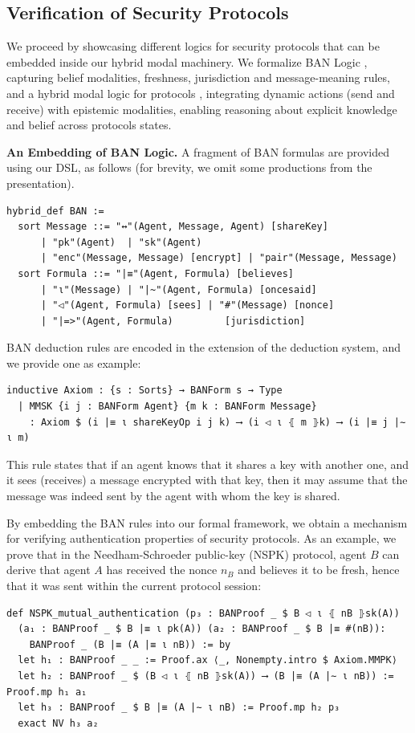 \documentclass{easychair}
\theoremstyle{remark}
\begin{document}
\subsection{Verification of Security Protocols}

We proceed by showcasing different logics for security protocols that can be embedded inside our hybrid modal machinery. We formalize BAN Logic \cite{ban}, capturing belief modalities, freshness, jurisdiction and message-meaning rules, and a hybrid modal logic for protocols \cite{ramics}, integrating dynamic actions (send and receive) with epistemic modalities, enabling reasoning about explicit knowledge and belief across protocols states. 

{\bf An Embedding of BAN Logic.} A fragment of BAN formulas are provided using our DSL, as follows (for brevity, we omit some productions from the presentation).
\begin{lstlisting}
hybrid_def BAN :=
  sort Message ::= "↔"(Agent, Message, Agent) [shareKey]
      | "pk"(Agent)  | "sk"(Agent)
      | "enc"(Message, Message) [encrypt] | "pair"(Message, Message)
  sort Formula ::= "|≡"(Agent, Formula) [believes]
      | "ι"(Message) | "|~"(Agent, Formula) [oncesaid]
      | "◁"(Agent, Formula) [sees] | "#"(Message) [nonce]
      | "|=>"(Agent, Formula)         [jurisdiction]
\end{lstlisting}

BAN deduction rules are encoded in the extension of the deduction system, and we provide one as example: 
\begin{lstlisting}
inductive Axiom : {s : Sorts} → BANForm s → Type
  | MMSK {i j : BANForm Agent} {m k : BANForm Message}
    : Axiom $ (i |≡ ι shareKeyOp i j k) ⟶ (i ◁ ι ⦃ m ⦄k) ⟶ (i |≡ j |∼ ι m)
\end{lstlisting}

This rule states that if an agent knows that it shares a key with another one, and it sees (receives) a message encrypted with that key, then it may assume that the message was indeed sent by the agent with whom the key is shared. 

By embedding the BAN rules into our formal framework, we obtain a mechanism for verifying authentication properties of security protocols. As an example, we prove that in the Needham-Schroeder public-key (NSPK) protocol, agent $B$ can derive that agent $A$ has received the nonce $n_B$ and believes it to be fresh, hence that it was sent within the current protocol session: 
\begin{lstlisting}
def NSPK_mutual_authentication (p₃ : BANProof _ $ B ◁ ι ⦃ nB ⦄sk(A))
  (a₁ : BANProof _ $ B |≡ ι pk(A)) (a₂ : BANProof _ $ B |≡ #(nB)):
    BANProof _ (B |≡ (A |≡ ι nB)) := by
  let h₁ : BANProof _ _ := Proof.ax ⟨_, Nonempty.intro $ Axiom.MMPK⟩
  let h₂ : BANProof _ $ (B ◁ ι ⦃ nB ⦄sk(A)) ⟶ (B |≡ (A |∼ ι nB)) := Proof.mp h₁ a₁
  let h₃ : BANProof _ $ B |≡ (A |∼ ι nB) := Proof.mp h₂ p₃
  exact NV h₃ a₂
\end{lstlisting}
\end{document}
